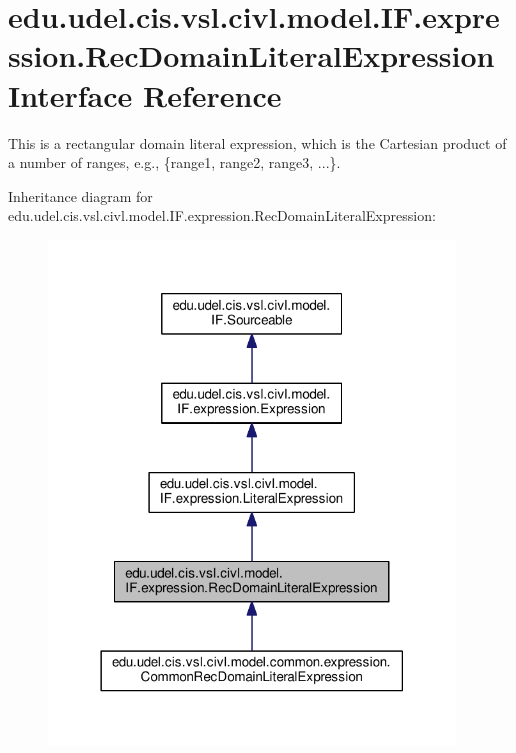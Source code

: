 \hypertarget{interfaceedu_1_1udel_1_1cis_1_1vsl_1_1civl_1_1model_1_1IF_1_1expression_1_1RecDomainLiteralExpression}{}\section{edu.\+udel.\+cis.\+vsl.\+civl.\+model.\+I\+F.\+expression.\+Rec\+Domain\+Literal\+Expression Interface Reference}
\label{interfaceedu_1_1udel_1_1cis_1_1vsl_1_1civl_1_1model_1_1IF_1_1expression_1_1RecDomainLiteralExpression}


This is a rectangular domain literal expression, which is the Cartesian product of a number of ranges, e.\+g., {\ttfamily \{range1, range2, range3, ...\}}.  




Inheritance diagram for edu.\+udel.\+cis.\+vsl.\+civl.\+model.\+I\+F.\+expression.\+Rec\+Domain\+Literal\+Expression\+:
\nopagebreak
\begin{figure}[H]
\begin{center}
\leavevmode
\includegraphics[width=306pt]{interfaceedu_1_1udel_1_1cis_1_1vsl_1_1civl_1_1model_1_1IF_1_1expression_1_1RecDomainLiteralExpression__inherit__graph}
\end{center}
\end{figure}


